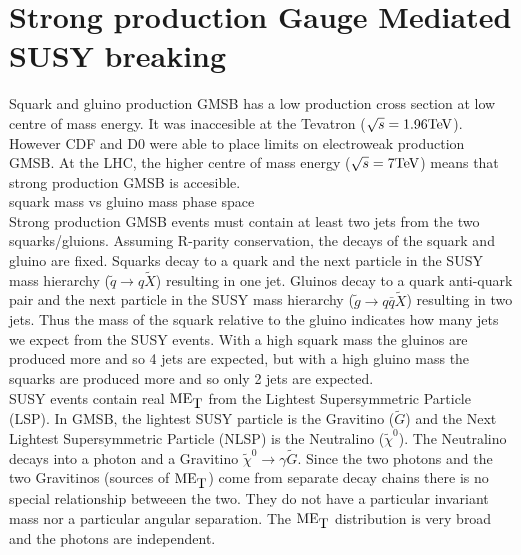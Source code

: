 \section{Strong production Gauge Mediated SUSY breaking}

Squark and gluino production GMSB has a low production cross section at low
centre of mass energy. It was inaccesible at the Tevatron ($\sqrt{s} = 
1.96\mbox{TeV}$). However CDF and D0 were able to place limits on electroweak 
production GMSB. At the LHC, the higher centre of mass energy ($\sqrt{s} = 
7\mbox{TeV}$) means that strong production GMSB is accesible. \\

squark mass vs gluino mass phase space \\ 

Strong production GMSB events must contain at least two jets from the two
squarks/gluions. Assuming R-parity conservation, the decays of the squark and
gluino are fixed. Squarks decay to a quark and the next particle in the SUSY mass
hierarchy ($\tilde{q}\rightarrow q\tilde{X}$) resulting in one jet. Gluinos decay 
to a quark anti-quark pair and the next particle in the SUSY mass hierarchy
($\tilde{g}\rightarrow q\bar{q}\tilde{X}$) resulting in two jets. Thus the mass
of the squark relative to the gluino indicates how many jets we expect from the
SUSY events. With a high squark mass the gluinos are produced more and so 4 jets
are expected, but with a high gluino mass the squarks are produced more and so
only 2 jets are expected. \\

SUSY events contain real $\mbox{ME}_{\mbox{T}}$ from the Lightest Supersymmetric Particle (LSP).
In GMSB, the lightest SUSY particle is the Gravitino ($\tilde{G}$) and the Next
Lightest Supersymmetric Particle (NLSP) is the Neutralino ($\tilde{\chi}^{0}$).
The Neutralino decays into a photon and a Gravitino $\tilde{\chi}^{0}\rightarrow
\gamma\tilde{G}$. Since the two photons and the two Gravitinos (sources of 
$\mbox{ME}_{\mbox{T}}$) come from separate decay chains there is no special relationship
betweeen the two. They do not have a particular invariant mass nor a particular
angular separation. The $\mbox{ME}_{\mbox{T}}$ distribution is very broad and the photons are
independent.


